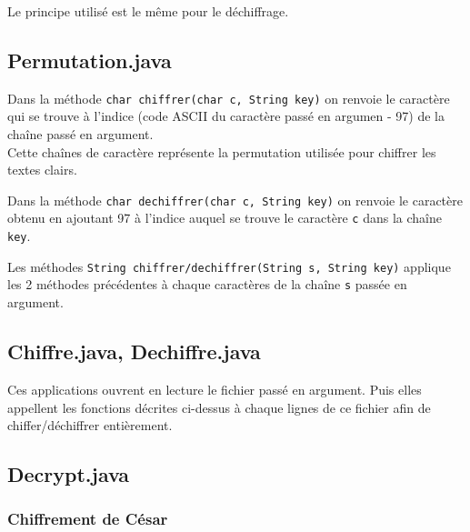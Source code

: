 \documentclass{article}
\begin{document}
Le principe utilisé est le même pour le déchiffrage. \\
\vspace{2\baselineskip}

\subsection{Permutation.java}
\vspace{1\baselineskip}

Dans la méthode \texttt{char chiffrer(char c, String key)} on renvoie le caractère qui se trouve à l'indice (code ASCII du caractère passé en argumen - 97) de la chaîne passé en argument. \\
Cette chaînes de caractère représente la permutation utilisée pour chiffrer les textes clairs. \\
\vspace{1\baselineskip}

Dans la méthode \texttt{char dechiffrer(char c, String key)} on renvoie le caractère obtenu en ajoutant 97 à l'indice auquel se trouve le caractère \texttt{c} dans la chaîne \texttt{key}. \\
\vspace{1\baselineskip}

Les méthodes \texttt{String chiffrer/dechiffrer(String s, String key)} applique les 2 méthodes précédentes à chaque caractères de la chaîne \texttt{s} passée en argument. \\
\vspace{2\baselineskip}

\subsection{Chiffre.java, Dechiffre.java}
\vspace{1\baselineskip}

Ces applications ouvrent en lecture le fichier passé en argument. Puis elles appellent les fonctions décrites ci-dessus à chaque lignes de ce fichier afin de chiffer/déchiffrer entièrement. \\
\vspace{2\baselineskip}

\subsection{Decrypt.java}
\vspace{1\baselineskip}

\subsubsection{Chiffrement de César}
\vspace{1\baselineskip}
\end{document}
